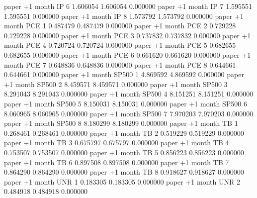      paper  +1 month       IP                 6 1.606054       1.606054           0.000000
     paper  +1 month       IP                 7 1.595551       1.595551           0.000000
     paper  +1 month       IP                 8 1.573792       1.573792           0.000000
     paper  +1 month      PCE                 1 0.487479       0.487479           0.000000
     paper  +1 month      PCE                 2 0.729228       0.729228           0.000000
     paper  +1 month      PCE                 3 0.737832       0.737832           0.000000
     paper  +1 month      PCE                 4 0.720724       0.720724           0.000000
     paper  +1 month      PCE                 5 0.682655       0.682655           0.000000
     paper  +1 month      PCE                 6 0.661620       0.661620           0.000000
     paper  +1 month      PCE                 7 0.648836       0.648836           0.000000
     paper  +1 month      PCE                 8 0.644661       0.644661           0.000000
     paper  +1 month    SP500                 1 4.869592       4.869592           0.000000
     paper  +1 month    SP500                 2 8.459571       8.459571           0.000000
     paper  +1 month    SP500                 3 8.291043       8.291043           0.000000
     paper  +1 month    SP500                 4 8.151251       8.151251           0.000000
     paper  +1 month    SP500                 5 8.150031       8.150031           0.000000
     paper  +1 month    SP500                 6 8.060965       8.060965           0.000000
     paper  +1 month    SP500                 7 7.970203       7.970203           0.000000
     paper  +1 month    SP500                 8 8.180299       8.180299           0.000000
     paper  +1 month       TB                 1 0.268461       0.268461           0.000000
     paper  +1 month       TB                 2 0.519229       0.519229           0.000000
     paper  +1 month       TB                 3 0.675797       0.675797           0.000000
     paper  +1 month       TB                 4 0.753507       0.753507           0.000000
     paper  +1 month       TB                 5 0.856223       0.856223           0.000000
     paper  +1 month       TB                 6 0.897508       0.897508           0.000000
     paper  +1 month       TB                 7 0.864290       0.864290           0.000000
     paper  +1 month       TB                 8 0.918627       0.918627           0.000000
     paper  +1 month      UNR                 1 0.183305       0.183305           0.000000
     paper  +1 month      UNR                 2 0.484918       0.484918           0.000000
